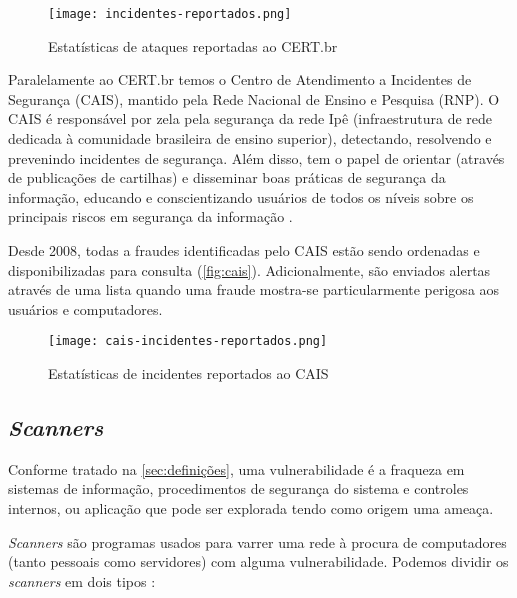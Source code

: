 \begin{figure}[htb]
 \centering
 \caption{Estatísticas de ataques reportadas ao CERT.br}
 \texttt{[image: incidentes-reportados.png]}
 \label{fig:cert}
\end{figure}

Paralelamente ao CERT.br temos o Centro de Atendimento a Incidentes de Segurança (CAIS), mantido pela Rede Nacional de Ensino e Pesquisa (RNP). O CAIS é responsável por zela pela segurança da rede Ipê (infraestrutura de rede dedicada à comunidade brasileira de ensino superior), detectando, resolvendo e prevenindo incidentes de segurança. Além disso, tem o papel de orientar (através de publicações de cartilhas) e disseminar boas práticas de segurança da informação, educando e conscientizando usuários de todos os níveis sobre os principais riscos em segurança da informação \cite{cais}.

Desde 2008, todas a fraudes identificadas pelo CAIS estão sendo ordenadas e disponibilizadas para consulta (\autoref{fig:cais}). Adicionalmente, são enviados alertas através de uma lista quando uma fraude mostra-se particularmente perigosa aos usuários e computadores.

\begin{figure}[htb]
 \centering
 \caption{Estatísticas de incidentes reportados ao CAIS}
 \texttt{[image: cais-incidentes-reportados.png]}
 \label{fig:cais}
\end{figure}

\subsection{\textit{Scanners}} \label{sec:scanners}

Conforme tratado na \autoref{sec:definições}, uma vulnerabilidade é a fraqueza em sistemas de informação, procedimentos de segurança do sistema e controles internos, ou aplicação que pode ser explorada tendo como origem uma ameaça. 

\textit{Scanners} são programas usados para varrer uma rede à procura de computadores (tanto pessoais como servidores) com alguma vulnerabilidade. Podemos dividir os \textit{scanners} em dois tipos \cite{univhacker}: 

